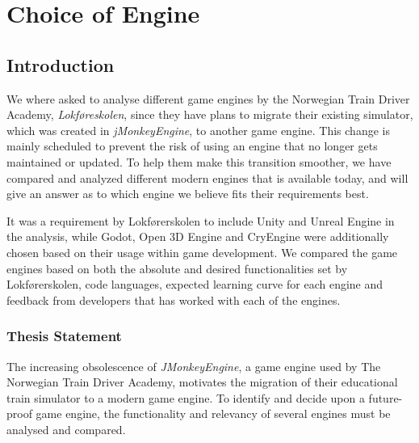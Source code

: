 \section{Choice of Engine}

\subsection{Introduction}
We where asked to analyse different game engines by the Norwegian Train Driver Academy, \textit{Lokføreskolen}, since they have plans to migrate their existing simulator\footnotemark[1], which was created in \textit{jMonkeyEngine}, to another game engine. This change is mainly scheduled to prevent the risk of using an engine that no longer gets maintained or updated. To help them make this transition smoother, we have compared and analyzed different modern engines that is available today, and will give an answer as to which engine we believe fits their requirements best.

It was a requirement by Lokførerskolen to include Unity and Unreal Engine in the analysis, while Godot, Open 3D Engine and CryEngine were additionally chosen based on their usage within game development.\cite{g2_game_engines}
We compared the game engines based on both the absolute and desired functionalities set by Lokførerskolen, code languages, expected learning curve for each engine and feedback from developers that has worked with each of the engines. 



\subsubsection{Thesis Statement}
The increasing obsolescence of \textit{JMonkeyEngine}, a game engine used by The Norwegian Train Driver Academy, motivates the migration of their educational train simulator to a modern game engine. To identify and decide upon a future-proof game engine, the functionality and relevancy of several engines must be analysed and compared.

